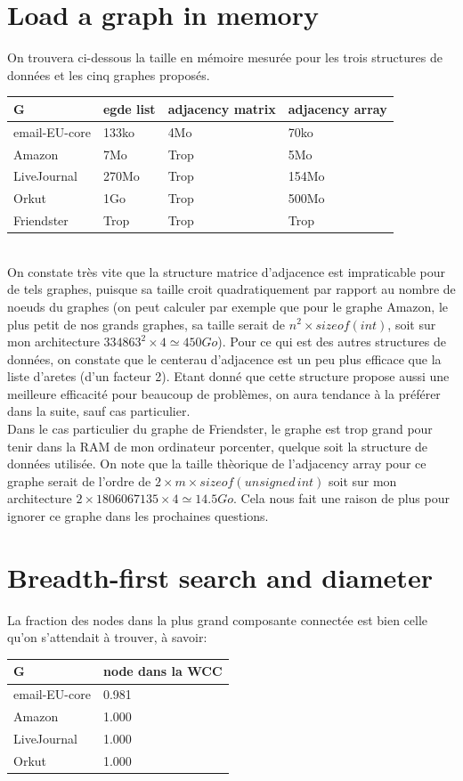 \documentclass[a4paper]{report}
\begin{document}
\section{Load a graph in memory}
On trouvera ci-dessous la taille en mémoire mesurée pour les trois structures de données et les cinq graphes proposés.

\begin{tabular}{|l|l|l|l|}
  \hline
  G & egde list & adjacency matrix & adjacency array \\
  \hline
  email-EU-core & 133ko & 4Mo & 70ko \\
  Amazon & 7Mo & Trop & 5Mo \\
  LiveJournal & 270Mo & Trop & 154Mo \\
  Orkut & 1Go & Trop & 500Mo \\
  Friendster & Trop & Trop & Trop \\
  \hline
\end{tabular}\\
On constate très vite que la structure matrice d'adjacence est impraticable pour de tels graphes, puisque sa taille croit quadratiquement par rapport au nombre de noeuds du graphes (on peut calculer par exemple que pour le graphe Amazon, le plus petit de nos grands graphes, sa taille serait de $n^2 \times sizeof(int)$, soit sur mon architecture $334863^2 \times 4 \simeq 450Go$). Pour ce qui est des autres structures de données, on constate que le centerau d'adjacence est un peu plus efficace que la liste d'aretes (d'un facteur 2). Etant donné que cette structure propose aussi une meilleure efficacité pour beaucoup de problèmes, on aura tendance à la préférer dans la suite, sauf cas particulier.\\
Dans le cas particulier du graphe de Friendster, le graphe est trop grand pour tenir dans la RAM de mon ordinateur porcenter, quelque soit la structure de données utilisée. On note que la taille thèorique de l'adjacency array pour ce graphe serait de l'ordre de $2\times m \times sizeof(unsigned\,int)$ soit sur mon architecture $2 \times 1806067135 \times 4 \simeq 14.5Go$. Cela nous fait une raison de plus pour ignorer ce graphe dans les prochaines questions.

\section{Breadth-first search and diameter}

La fraction des nodes dans la plus grand composante connectée est bien celle qu'on s'attendait à trouver, à savoir:
\begin{center}
  \begin{tabular}{|l|l|}
    \hline
    G & node dans la WCC \\
    \hline
    email-EU-core & 0.981\\
    Amazon & 1.000\\
    LiveJournal & 1.000\\
    Orkut & 1.000\\
    \hline
  \end{tabular}
\end{center}
\end{document}
